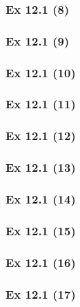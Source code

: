 \subsubsection{Ex 12.1 (8)}\label{sec:Ex_12.1.8}

\subsubsection{Ex 12.1 (9)}\label{sec:Ex_12.1.9}

\subsubsection{Ex 12.1 (10)}\label{sec:Ex_12.1.10}

\newpage		%

\subsubsection{Ex 12.1 (11)}\label{sec:Ex_12.1.11}

\subsubsection{Ex 12.1 (12)}\label{sec:Ex_12.1.12}

\subsubsection{Ex 12.1 (13)}\label{sec:Ex_12.1.13}

\subsubsection{Ex 12.1 (14)}\label{sec:Ex_12.1.14}

\subsubsection{Ex 12.1 (15)}\label{sec:Ex_12.1.15}

\subsubsection{Ex 12.1 (16)}\label{sec:Ex_12.1.16}

\subsubsection{Ex 12.1 (17)}\label{sec:Ex_12.1.17}

